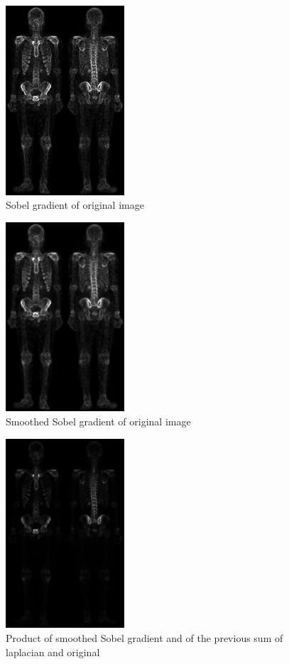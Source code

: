\documentclass[10pt]{article}
\begin{document}
\begin{figure}[!ht]
	\centering
	\includegraphics[height=200pt]{./ex2/skeleton_sobel.jpg}
	\caption{Sobel gradient of original image}
\end{figure}
\begin{figure}[!ht]
	\centering
	\includegraphics[height=200pt]{./ex2/skeleton_smmoth_sobel.jpg}
	\caption{Smoothed Sobel gradient of original image}
\end{figure}
\begin{figure}[!ht]
	\centering
	\includegraphics[height=200pt]{./ex2/skeleton_product.jpg}
	\caption{Product of smoothed Sobel gradient and of the previous sum of laplacian and original}
\end{figure}
\end{document}
